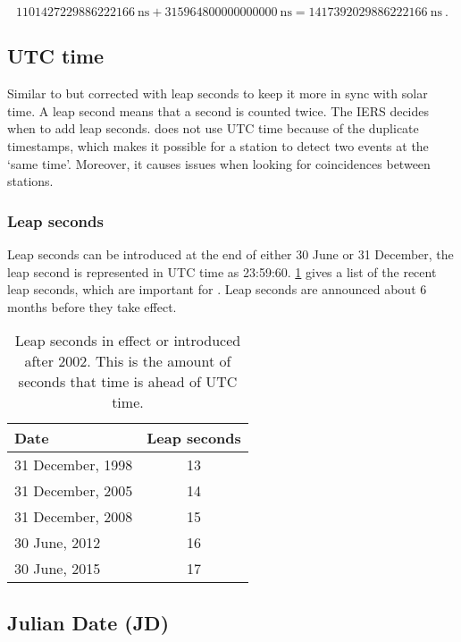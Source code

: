 \begin{equation}
    \SI{1101427229886222166}{\nano\second} +
        \SI{315964800000000000}{\nano\second} =
        \SI{1417392029886222166}{\nano\second} \ .
\end{equation}


\subsection{UTC time}

Similar to \gps but corrected with leap seconds to keep it more in sync
with solar time. A leap second means that a second is counted twice. The
IERS decides when to add leap seconds. \hisparc does not use UTC time
because of the duplicate timestamps, which makes it possible for a
station to detect two events at the `same time'. Moreover, it causes
issues when looking for coincidences between stations.


\subsubsection{Leap seconds}

Leap seconds can be introduced at the end of either 30 June or 31
December, the leap second is represented in UTC time as 23:59:60.
\cref{table:leapseconds} gives a list of the recent leap seconds,
which are important for \hisparc. Leap seconds are announced about 6
months before they take effect.

\begin{table}
    \centering
    \begin{tabular}{ l c }
        \toprule
        Date & Leap seconds \\
        \midrule
        31 December, 1998 & 13 \\
        31 December, 2005 & 14 \\
        31 December, 2008 & 15 \\
        30 June, 2012 & 16 \\
        30 June, 2015 & 17 \\
        \bottomrule
    \end{tabular}
   \caption{Leap seconds in effect or introduced after 2002. This is the
            amount of seconds that \gps time is ahead of UTC time.}
   \label{table:leapseconds}
\end{table}


\subsection{Julian Date (JD)}

